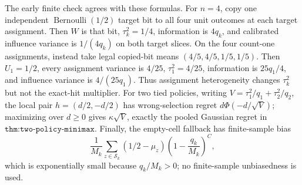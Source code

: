 The early finite check agrees with these formulas.  For \(n=4\), copy one independent \(\operatorname{Bernoulli}(1/2)\) target bit to all four unit outcomes at each target assignment.  Then \(W\) is that bit, \(\tau_k^2=1/4\), information is \(4q_k\), and calibrated influence variance is \(1/(4q_k)\) on both target slices.  On the four count-one assignments, instead take legal copied-bit means \((4/5,4/5,1/5,1/5)\).  Then \(U_1=1/2\), every assignment variance is \(4/25\), \(\tau_1^2=4/25\), information is \(25q_1/4\), and influence variance is \(4/(25q_1)\).  Thus assignment heterogeneity changes \(\tau_k^2\) but not the exact-hit multiplier.  For two tied policies, writing \(V=\tau_1^2/q_1+\tau_2^2/q_2\), the local pair \(h=(d/2,-d/2)\) has wrong-selection regret \(d\Phi(-d/\sqrt V)\); maximizing over \(d\geq0\) gives \(\kappa\sqrt V\), exactly the pooled Gaussian regret in \(\texttt{thm:two-policy-minimax}\).  Finally, the empty-cell fallback has finite-sample bias
\[
\frac1{M_k}\sum_{z\in\mathcal S_k}(1/2-\mu_z)
\left(1-\frac{q_k}{M_k}\right)^C,
\]
which is exponentially small because \(q_k/M_k>0\); no finite-sample unbiasedness is used.